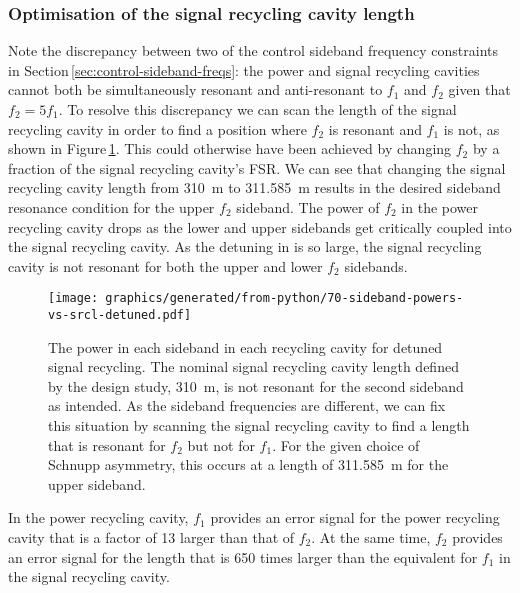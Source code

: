 \subsubsection{Optimisation of the signal recycling cavity length}
Note the discrepancy between two of the control sideband frequency constraints in Section\,\ref{sec:control-sideband-freqs}: the power and signal recycling cavities cannot both be simultaneously resonant and anti-resonant to $f_1$ and $f_2$ given that $f_2 = 5 f_1$. To resolve this discrepancy we can scan the length of the signal recycling cavity in order to find a position where $f_2$ is resonant and $f_1$ is not, as shown in Figure\,\ref{fig:sideband-powers-srcl-detuned}. This could otherwise have been achieved by changing $f_2$ by a fraction of the signal recycling cavity's \gls{FSR}. We can see that changing the signal recycling cavity length from \SI{310}{\meter} to \SI{311.585}{\meter} results in the desired sideband resonance condition for the upper $f_2$ sideband. The power of $f_2$ in the power recycling cavity drops as the lower and upper sidebands get critically coupled into the signal recycling cavity. As the detuning in \ETLF{} is so large, the signal recycling cavity is not resonant for both the upper and lower $f_2$ sidebands.

\begin{figure}
  \centering
  \texttt{[image: graphics/generated/from-python/70-sideband-powers-vs-srcl-detuned.pdf]}
  \caption[Power of the control sidebands in the signal recycling cavity as a function of length of \ETLF{} in the detuned configuration]{\label{fig:sideband-powers-srcl-detuned}The power in each sideband in each recycling cavity for detuned signal recycling. The nominal signal recycling cavity length defined by the design study, \SI{310}{\meter}, is not resonant for the second sideband as intended. As the sideband frequencies are different, we can fix this situation by scanning the signal recycling cavity to find a length that is resonant for $f_2$ but not for $f_1$. For the given choice of Schnupp asymmetry, this occurs at a length of \SI{311.585}{\meter} for the upper sideband.}
\end{figure}

In the power recycling cavity, $f_1$ provides an error signal for the power recycling cavity that is a factor of \num{13} larger than that of $f_2$. At the same time, $f_2$ provides an error signal for the length that is \num{650} times larger than the equivalent for $f_1$ in the signal recycling cavity.

